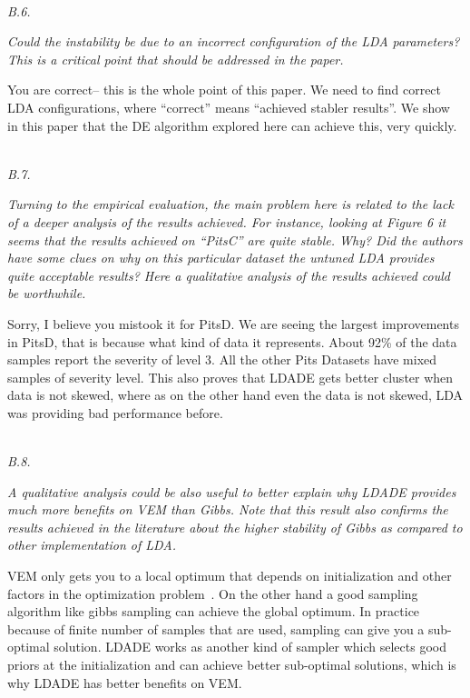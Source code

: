 \documentclass[conference]{IEEEtran}
\begin{document}
\noindent
\textit{\\B.6.}  

\textit{Could the instability be due to an incorrect configuration of the LDA parameters? This is a critical point that should be addressed in the paper.\\}

You are correct-- this is the  whole point of this paper. We need to find correct LDA configurations, where ``correct'' means ``achieved stabler results''. We show in this paper that the DE algorithm explored here can achieve
this, very quickly.

\noindent
\textit{\\B.7.}   

\textit{Turning to the empirical evaluation, the main problem here is related to the lack of a deeper analysis of the results achieved. For instance, looking at Figure 6 it seems that the results achieved on “PitsC” are quite stable. Why? Did the authors have some clues on why on this particular dataset the untuned LDA provides quite acceptable results? Here a qualitative analysis of the results achieved could be worthwhile.\\}

Sorry, I believe you mistook it for PitsD. We are seeing the largest improvements in PitsD, that is because what kind of data it represents. About 92\% of the data samples report the severity of level 3.  All the other Pits Datasets have mixed samples of severity level. This also proves that LDADE gets better cluster when data is not skewed, where as on the other hand even the data is not skewed, LDA was providing bad performance before.

\noindent
\textit{\\B.8.} 

\textit{A qualitative analysis could be also useful to better explain why LDADE provides much more benefits on VEM than Gibbs. Note that this result also confirms the results achieved in the literature about the higher stability of Gibbs as compared to other implementation of LDA.\\}

VEM only gets you to a local optimum that depends on initialization and other factors in the optimization problem~\cite{asuncion2009smoothing}. On the other hand a good sampling algorithm like gibbs sampling can achieve the global optimum. In practice because of finite number of samples that are used, sampling can give you a sub-optimal solution. LDADE works as another kind of sampler which selects good priors at the initialization and can achieve better sub-optimal solutions, which is why LDADE has better benefits on VEM.
\end{document}
